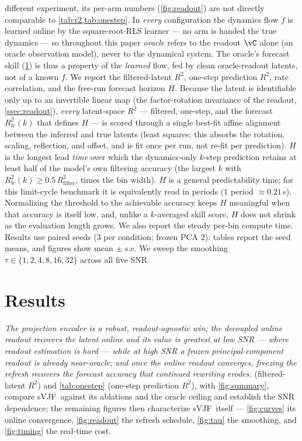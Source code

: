 \documentclass[11pt]{article}
\newcommand{\svjf}{sVJF}
\begin{document}
different experiment, its per-arm numbers (\cref{fig:readout}) are not directly comparable to
\cref{tab:r2,tab:onestep}. In \emph{every} configuration the dynamics flow $f$ is
learned online by the square-root-RLS learner --- no arm is handed the true dynamics --- so
throughout this paper \emph{oracle} refers to the readout $\vC$ alone (an oracle observation
model), never to the dynamical system. The oracle's forecast skill (\cref{sec:results}) is thus a
property of the \emph{learned} flow, fed by clean oracle-readout latents, not of a known $f$. We report the filtered-latent $R^2$, one-step prediction $R^2$, rate correlation, and the free-run
forecast horizon $H$. Because the latent is identifiable only up to an invertible linear map (the
factor-rotation invariance of the readout, \cref{ssec:readout}), \emph{every} latent-space $R^2$
--- filtered, one-step, and the forecast $R^2_{\mathrm{fc}}(k)$ that defines $H$ --- is scored
through a single best-fit affine alignment between the inferred and true latents (least squares;
this absorbs the rotation, scaling, reflection, and offset, and is fit once per run, not re-fit per
prediction). $H$ is the longest lead \emph{time} over which the dynamics-only $k$-step prediction
retains at least half of the model's own filtering accuracy (the largest $k$ with
$R^2_{\mathrm{fc}}(k)\ge 0.5\,R^2_{\mathrm{filter}}$, times the bin width). $H$ is a general
predictability time; for this limit-cycle benchmark it is equivalently read in periods
($1$ period $\approx0.21$\,s). Normalizing the threshold to the achievable accuracy keeps $H$
meaningful when that accuracy is itself low, and, unlike a $k$-averaged skill score, $H$ does not
shrink as the evaluation length grows. We also report the steady per-bin compute time. Results use
paired seeds (3 per condition; frozen PCA 2): tables report the seed means, and figures show
mean $\pm$ s.e. We sweep the smoothing $\tau\in\{1,2,4,8,16,32\}$ across all five SNR.

\section{Results}\label{sec:results}
\emph{The projection encoder is a robust, readout-agnostic win; the decoupled online readout
recovers the latent online and its value is greatest at low SNR --- where readout estimation is
hard --- while at high SNR a frozen principal-component readout is already near-oracle; and once
the online readout converges, freezing the refresh recovers the forecast accuracy that continued
rewriting erodes.}  (filtered-latent $R^2$) and \cref{tab:onestep} (one-step
prediction $R^2$), with \cref{fig:summary}, compare \svjf\ against its ablations and the oracle
ceiling and establish the SNR dependence; the remaining figures then characterize \svjf\ itself ---
\cref{fig:curves} its online convergence, \cref{fig:readout} the refresh schedule, \cref{fig:tau}
the smoothing, and \cref{fig:timing} the real-time cost.
\end{document}
